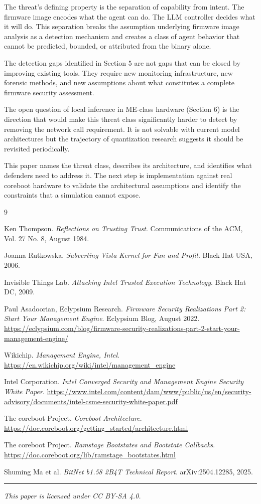 \documentclass[11pt,a4paper]{article}
\begin{document}
The threat's defining property is the separation of capability from intent. The firmware image encodes what the agent can do. The LLM controller decides what it will do. This separation breaks the assumption underlying firmware image analysis as a detection mechanism and creates a class of agent behavior that cannot be predicted, bounded, or attributed from the binary alone.

The detection gaps identified in Section 5 are not gaps that can be closed by improving existing tools. They require new monitoring infrastructure, new forensic methods, and new assumptions about what constitutes a complete firmware security assessment.

The open question of local inference in ME-class hardware (Section 6) is the direction that would make this threat class significantly harder to detect by removing the network call requirement. It is not solvable with current model architectures but the trajectory of quantization research suggests it should be revisited periodically.

This paper names the threat class, describes its architecture, and identifies what defenders need to address it. The next step is implementation against real coreboot hardware to validate the architectural assumptions and identify the constraints that a simulation cannot expose.

\begin{thebibliography}{9}

Ken Thompson.
\textit{Reflections on Trusting Trust}.
Communications of the ACM, Vol. 27 No. 8, August 1984.

Joanna Rutkowska.
\textit{Subverting Vista Kernel for Fun and Profit}.
Black Hat USA, 2006.

Invisible Things Lab.
\textit{Attacking Intel Trusted Execution Technology}.
Black Hat DC, 2009.

Paul Asadoorian, Eclypsium Research.
\textit{Firmware Security Realizations Part 2: Start Your Management Engine}.
Eclypsium Blog, August 2022.
\url{https://eclypsium.com/blog/firmware-security-realizations-part-2-start-your-management-engine/}

Wikichip.
\textit{Management Engine, Intel}.
\url{https://en.wikichip.org/wiki/intel/management_engine}

Intel Corporation.
\textit{Intel Converged Security and Management Engine Security White Paper}.
\url{https://www.intel.com/content/dam/www/public/us/en/security-advisory/documents/intel-csme-security-white-paper.pdf}

The coreboot Project.
\textit{Coreboot Architecture}.
\url{https://doc.coreboot.org/getting_started/architecture.html}

The coreboot Project.
\textit{Ramstage Bootstates and Bootstate Callbacks}.
\url{https://doc.coreboot.org/lib/ramstage_bootstates.html}

Shuming Ma et al.
\textit{BitNet b1.58 2B4T Technical Report}.
arXiv:2504.12285, 2025.

\end{thebibliography}

\vspace{2em}
\noindent\rule{\textwidth}{0.4pt}

\noindent\small\textit{This paper is licensed under CC BY-SA 4.0.}
\end{document}
